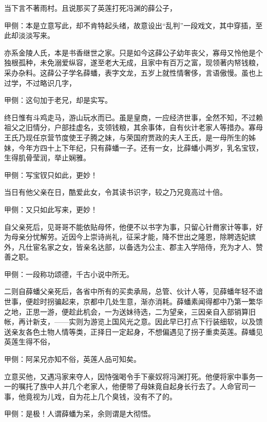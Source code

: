 \begin{parag}
    当下言不著雨村。且说那买了英莲打死冯渊的薛公子，\begin{note}甲侧：本是立意写此，却不肯特起头绪，故意设出“乱判”一段戏文，其中穿插，至此却淡淡写来。\end{note}亦系金陵人氏，本是书香继世之家。只是如今这薛公子幼年丧父，寡母又怜他是个独根孤种，未免溺爱纵容，遂至老大无成，且家中有百万之富，现领著内帑钱粮，采办杂料。这薛公子学名薛蟠，表字文龙，五岁上就性情奢侈，言语傲慢。虽也上过学，不过略识几字，\begin{note}甲侧：这句加于老兄，却是实写。\end{note}终日惟有斗鸡走马，游山玩水而已。虽是皇商，一应经济世事，全然不知，不过赖祖父之旧情分，户部挂虚名，支领钱粮，其余事体，自有伙计老家人等措办。寡母王氏乃现任京营节度使王子腾之妹，与荣国府贾政的夫人王氏，是一母所生的姊妹，今年方四十上下年纪，只有薛蟠一子。还有一女，比薛蟠小两岁，乳名宝钗，生得肌骨莹润，举止娴雅。\begin{note}甲侧：写宝钗只如此，更妙！\end{note}当日有他父亲在日，酷爱此女，令其读书识字，较之乃兄竟高过十倍。\begin{note}甲侧：又只如此写来，更妙！\end{note}自父亲死后，见哥哥不能依贴母怀，他便不以书字为事，只留心针黹家计等事，好为母亲分忧解劳。近因今上崇诗尚礼，征采才能，降不世出之隆恩，除聘选妃嫔外，凡仕宦名家之女，皆亲名达部，以备选为公主、郡主入学陪侍，充为才人、赞善之职。\begin{note}甲侧：一段称功颂德，千古小说中所无。\end{note}二则自薛蟠父亲死后，各省中所有的买卖承局，总管、伙计人等，见薛蟠年轻不谙世事，便趁时拐骗起来，京都中几处生意，渐亦消耗。薛蟠素闻得都中乃第一繁华之地，正思一游，便趁此机会，一为送妹待选，二为望亲，三因亲自入部销算旧帐，再计新支，——实则为游览上国风光之意。因此早已打点下行装细软，以及馈送亲友各色土物人情等类，正择日一定起身，不想偏遇见了拐子重卖英莲。薛蟠见英莲生得不俗，\begin{note}甲侧：阿呆兄亦知不俗，英莲人品可知矣。\end{note}立意买他，又遇冯家来夺人，因恃强喝令手下豪奴将冯渊打死。他便将家中事务一一的嘱托了族中人并几个老家人，他便带了母妹竟自起身长行去了。人命官司一事，他竟视为儿戏，自为花上几个臭钱，没有不了的。\begin{note}甲侧：是极！人谓薛蟠为呆，余则谓是大彻悟。\end{note}
\end{parag}


